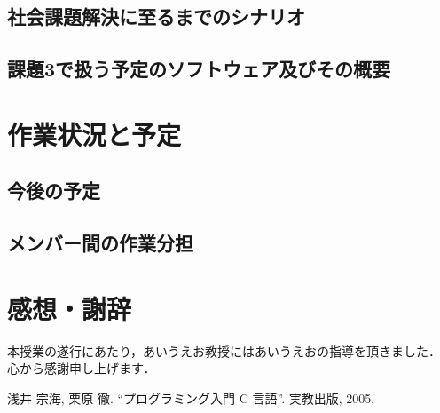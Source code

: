 \documentclass[a4j, titlepage]{jarticle}
\begin{document}
\subsection{社会課題解決に至るまでのシナリオ}

\subsection{課題3で扱う予定のソフトウェア及びその概要}

\section{作業状況と予定}
\subsection{今後の予定}

\subsection{メンバー間の作業分担}

\section{感想・謝辞}
本授業の遂行にあたり，あいうえお教授にはあいうえおの指導を頂きました．
心から感謝申し上げます．

\begin{thebibliography}{99}
 浅井 宗海, 栗原 徹. “プログラミング入門 C 言語”. 実教出版, 2005. %
\end{thebibliography}
\end{document}
